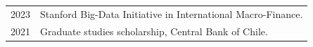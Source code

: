 
\begin{longtable}[l]{@{}p{} p{}}
    2023 & Stanford Big-Data Initiative in International Macro-Finance. \\
    2021 & Graduate studies scholarship, Central Bank of Chile.
   
\end{longtable}
